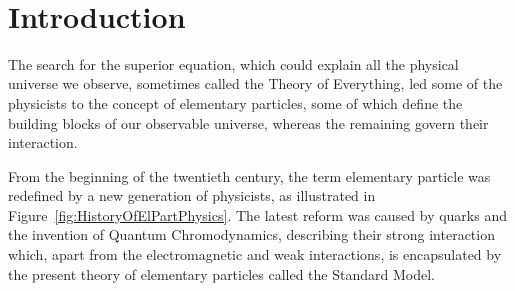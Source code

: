 \documentclass[a4paper,11pt,twoside,openright]{book}
\begin{document}
\newpage 
~

\clearpage
{}
\setcounter{page}{1}
\tableofcontents 



\cleardoublepage

\clearpage
{}
\setcounter{page}{1}

\chapter*{Introduction}

The search for the superior equation, which could explain all the physical universe
we observe, sometimes called the Theory of Everything, led some of the
physicists to the concept of elementary particles, some of which define the
building blocks of our observable universe, whereas the remaining govern their
interaction.

From the beginning of the twentieth century, the term elementary particle
was redefined by a new generation of physicists, as illustrated in
Figure~\ref{fig:HistoryOfElPartPhysics}. The latest reform was caused by quarks
and the invention of Quantum Chromodynamics, describing their strong interaction
which, apart from the electromagnetic and weak interactions, is encapsulated
by the present theory of elementary particles called the Standard Model. 
\end{document}

